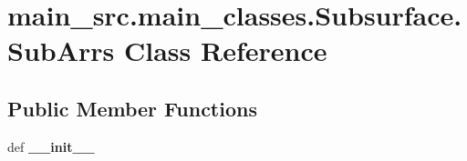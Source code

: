 \hypertarget{classmain__src_1_1main__classes_1_1Subsurface_1_1SubArrs}{\section{main\-\_\-src.\-main\-\_\-classes.\-Subsurface.\-Sub\-Arrs Class Reference}
\label{classmain__src_1_1main__classes_1_1Subsurface_1_1SubArrs}
}
\subsection*{Public Member Functions}
\begin{DoxyCompactItemize}
\item 
\hypertarget{classmain__src_1_1main__classes_1_1Subsurface_1_1SubArrs_ad4e63499c132ecdd9159c626ab87d9d1}{def {\bfseries \-\_\-\-\_\-init\-\_\-\-\_\-}}\label{classmain__src_1_1main__classes_1_1Subsurface_1_1SubArrs_ad4e63499c132ecdd9159c626ab87d9d1}

\end{DoxyCompactItemize}
